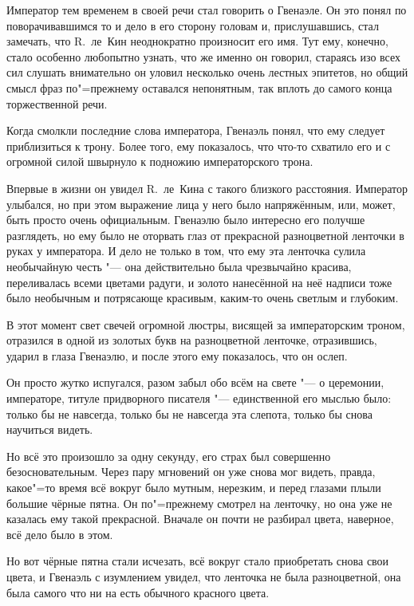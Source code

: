 Император тем временем в своей речи стал говорить о Гвенаэле.
Он это понял по поворачивавшимся то и дело в его сторону головам и,
прислушавшись, стал замечать, что R.~ле~Кин неоднократно произносит его имя.
Тут ему, конечно, стало особенно любопытно узнать, что же именно он говорил,
стараясь изо всех сил слушать внимательно он уловил несколько очень лестных
эпитетов, но общий смысл фраз по"=прежнему оставался непонятным, так вплоть до
самого конца торжественной речи.

Когда смолкли последние слова императора, Гвенаэль понял, что ему следует
приблизиться к трону.
Более того, ему показалось, что что-то схватило его и с огромной силой швырнуло
к подножию императорского трона.

Впервые в жизни он увидел R.~ле~Кина с такого близкого расстояния.
Император улыбался, но при этом выражение лица у него было напряжённым, или,
может, быть просто очень официальным.
Гвенаэлю было интересно его получше разглядеть, но ему было не оторвать глаз от
прекрасной разноцветной ленточки в руках у императора.
И дело не только в том, что ему эта ленточка сулила необычайную честь "--- она
действительно была чрезвычайно красива, переливалась всеми цветами радуги, и
золото нанесённой на неё надписи тоже было необычным и потрясающе красивым,
каким-то очень светлым и глубоким.

В этот момент свет свечей огромной люстры, висящей за императорским троном,
отразился в одной из золотых букв на разноцветной ленточке, отразившись, ударил
в глаза Гвенаэлю, и после этого ему показалось, что он ослеп.

Он просто жутко испугался, разом забыл обо всём на свете "--- о церемонии,
императоре, титуле придворного писателя "--- единственной его мыслью было:
только бы не навсегда, только бы не навсегда эта слепота, только бы снова
научиться видеть.

Но всё это произошло за одну секунду, его страх был совершенно безосновательным.
Через пару мгновений он уже снова мог видеть, правда, какое"=то время всё вокруг
было мутным, нерезким, и перед глазами плыли большие чёрные пятна.
Он по"=прежнему смотрел на ленточку, но она уже не казалась ему такой
прекрасной.
Вначале он почти не разбирал цвета, наверное, всё дело было в этом.

Но вот чёрные пятна стали исчезать, всё вокруг стало приобретать снова свои
цвета, и Гвенаэль с изумлением увидел, что ленточка не была разноцветной, она
была самого что ни на есть обычного красного цвета.

